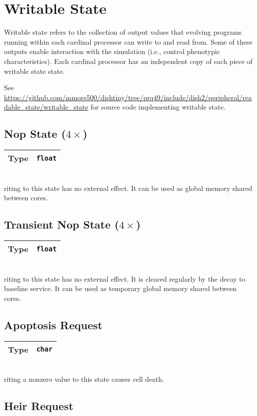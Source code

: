 \newcommand{\writablestatedef}[2]{
    \begin{tabular}{|
        >{\columncolor[HTML]{C0C0C0}}l |l|}
        \hline
        Type & \texttt{#1} \\ \hline
    \end{tabular} \\
}

\section{Writable State}

Writable state refers to the collection of output values that evolving programs running within each cardinal processor can write to and read from.
Some of these outputs enable interaction with the simulation (i.e., control phenotypic characteristics).
Each cardinal processor has an independent copy of each piece of writable state state.

See \url{https://github.com/mmore500/dishtiny/tree/prq49/include/dish2/peripheral/readable_state/writable_state} for source code implementing writable state.

\subsection{Nop State ($4\times$)}

\writablestatedef{float}

Writing to this state has no external effect.
It can be used as global memory shared between cores.

\subsection{Transient Nop State ($4\times$)}

\writablestatedef{float}

Writing to this state has no external effect.
It is cleared regularly by the decay to baseline service.
It can be used as temporary global memory shared between cores.

\subsection{Apoptosis Request}

\writablestatedef{char}

Writing a nonzero value to this state causes cell death.

\subsection{Heir Request}

